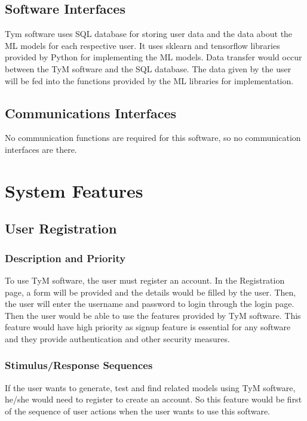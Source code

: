 \documentclass{scrreprt}
\begin{document}
\section{Software Interfaces}
Tym software uses SQL database for storing user data and the data about the ML models for each respective user. It uses sklearn and tensorflow libraries provided by Python for implementing the ML models. Data transfer would occur between the TyM software and the SQL database. The data given by the user will be fed into the functions provided by the ML libraries for implementation. 

\section{Communications Interfaces}
No communication functions are required for this software, so no communication interfaces are there.


\chapter{System Features}


\section{User Registration}

\subsection{Description and Priority}
To use TyM software, the user must register an account. In the Registration page, a form will be provided and the details would be filled by the user. Then, the user will enter the username and password to login through the login page. Then the user would be able to use the features provided by TyM software. This feature would have high priority as signup feature is essential for any software and they provide authentication and other security measures.

\subsection{Stimulus/Response Sequences}
If the user wants to generate, test and find related models using TyM software, he/she would need to register to create an account. So this feature would be first of the sequence of user actions when the user wants to use this software.  
\end{document}
